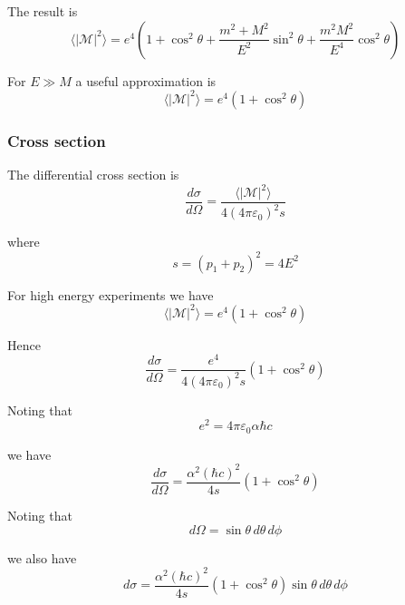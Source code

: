 \fi

The result is
\begin{equation*}
\langle|\mathcal{M}|^2\rangle
=e^4\left(1+\cos^2\theta+\frac{m^2+M^2}{E^2}\sin^2\theta+\frac{m^2M^2}{E^4}\cos^2\theta\right)
\end{equation*}

For $E\gg M$ a useful approximation is
\begin{equation*}
\langle|\mathcal{M}|^2\rangle=e^4\left(1+\cos^2\theta\right)
\end{equation*}

\subsubsection*{Cross section}

The differential cross section is
\begin{equation*}
\frac{d\sigma}{d\Omega}
=\frac{\langle|\mathcal{M}|^2\rangle}{4(4\pi\varepsilon_0)^2s}
\end{equation*}

where
\begin{equation*}
s=(p_1+p_2)^2=4E^2
\end{equation*}

For high energy experiments we have
\begin{equation*}
\langle|\mathcal{M}|^2\rangle=e^4\left(1+\cos^2\theta\right)
\end{equation*}

Hence
\begin{equation*}
\frac{d\sigma}{d\Omega}=\frac{e^4}{4(4\pi\varepsilon_0)^2s}\left(1+\cos^2\theta\right)
\end{equation*}

Noting that
\begin{equation*}
e^2=4\pi\varepsilon_0\alpha\hbar c
\end{equation*}

we have
\begin{equation*}
\frac{d\sigma}{d\Omega}=\frac{\alpha^2(\hbar c)^2}{4s}\left(1+\cos^2\theta\right)
\end{equation*}

Noting that
\begin{equation*}
d\Omega=\sin\theta\,d\theta\,d\phi
\end{equation*}

we also have
\begin{equation*}
d\sigma=\frac{\alpha^2(\hbar c)^2}{4s}\left(1+\cos^2\theta\right)
\sin\theta\,d\theta\,d\phi
\end{equation*}

